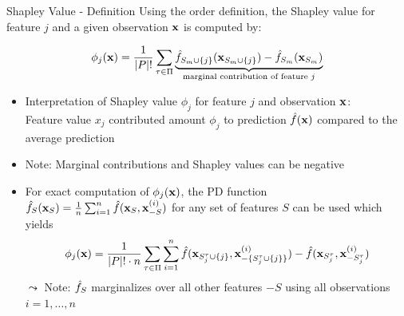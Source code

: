 \documentclass[11pt,compress,t,notes=noshow, aspectratio=169, xcolor=table]{beamer}
\newcommand{\Sm}{S_m}%
\newcommand{\Smj}{\Sm \cup \{j\}}
\newcommand{\Stau}{S_{j}^\tau}%
\newcommand{\Stauj}{\Stau \cup \{j\}}
\newcommand{\minusStauj}{- \{\Stau \cup \{j\} \} }
\begin{document}
\begin{frame}{Shapley Value - Definition  }
  Using the order definition, the Shapley value for feature $j$ and a given observation $\xv$ is computed by:

     $$ \phi_j(\xv)  = \frac{1}{|P|!} \sum_{\tau \in \Pi} \underbrace{\fh_{\Smj}(\xv_{\Smj}) - \fh_{\Sm}(\xv_{\Sm})}_{\text{marginal contribution of feature $j$}} $$ %
     
     
\begin{itemize}
    
  \item Interpretation of Shapley value $\phi_j$ for feature $j$ and observation $\xv$:\\
  Feature value $x_j$ contributed amount $\phi_j$ to prediction $\fh(\xv)$ compared to the average prediction
   \item Note: Marginal contributions and Shapley values can be negative
   \item For exact computation of $\phi_j(\xv) $, the PD function 
   $\fh_{S}(\xv_S) = \frac{1}{n} \sum_{i=1}^n \fh(\xv_S, \xv_{-S}^{(i)})$ 
   for any set of features $S$ can be used which yields
    $$ \phi_j(\xv) = \frac{1}{|P|! \cdot n} \sum_{\tau \in \Pi} \sum_{i = 1}^n
   \fh(\xv_{\Stauj}, \xv_{\minusStauj}^{(i)}) - \fh(\xv_{\Stau}, \xv_{- \Stau}^{(i)})
   $$
   $\leadsto$ Note: $\fh_S$ marginalizes over all other features $-S$ using all observations $i = 1, \ldots, n$
   
\end{itemize}
\lz

\end{frame}
\end{document}
